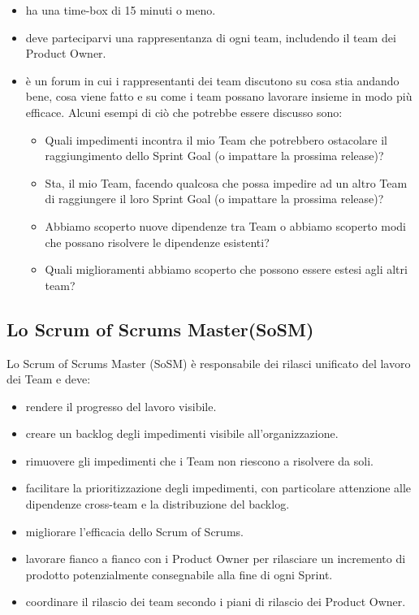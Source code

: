 \documentclass[italian,12pt,a4paper,parskip=full]{scrartcl}
\begin{document}
\begin{itemize}
\item ha una time-box di 15 minuti o meno.
\item deve parteciparvi una rappresentanza di ogni team, includendo il team dei Product Owner.
\item è un forum in cui i rappresentanti dei team discutono su cosa stia andando bene, cosa viene fatto e su come i team possano lavorare insieme in modo più efficace. Alcuni esempi di ciò che potrebbe essere discusso sono:
\begin{itemize}
\item Quali impedimenti incontra il mio Team che potrebbero ostacolare il raggiungimento dello Sprint Goal (o impattare la prossima release)? 
\item Sta, il mio Team, facendo qualcosa che possa impedire ad un altro Team di raggiungere il loro Sprint Goal (o impattare la prossima release)?
\item Abbiamo scoperto nuove dipendenze tra Team o abbiamo scoperto modi che possano risolvere le dipendenze esistenti?
\item Quali miglioramenti abbiamo scoperto che possono essere estesi agli altri team?
\end{itemize}
\end{itemize}

\subsection{Lo Scrum of Scrums Master(SoSM)}
Lo Scrum of Scrums Master (SoSM) è responsabile dei rilasci unificato del lavoro dei Team e deve:
\begin{itemize}
\item rendere il progresso del lavoro visibile.
\item creare un backlog degli impedimenti visibile all'organizzazione.
\item rimuovere gli impedimenti che i Team non riescono a risolvere da soli. 
\item facilitare la prioritizzazione degli impedimenti, con particolare attenzione alle dipendenze cross-team e la distribuzione del backlog. 
\item migliorare l'efficacia dello Scrum of Scrums.
\item lavorare fianco a fianco con i Product Owner per rilasciare un incremento di prodotto potenzialmente consegnabile alla fine di ogni Sprint.
\item coordinare il rilascio dei team secondo i piani di rilascio dei Product Owner.
\end{itemize}
\end{document}
